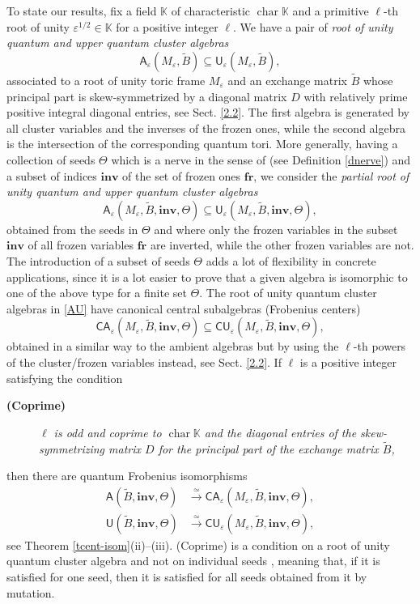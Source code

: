 \documentclass[11pt]{amsart}
\theoremstyle{plain}
\newcommand \thref[1]{Theorem \ref{t#1}}
\newcommand \deref[1]{Definition \ref{d#1}}
\def \KK {{\mathbb C}}
\def \KK {{\mathbb K}}
\def \A {{\boldsymbol{\mathsf A}}}
\def \C {{\boldsymbol{\mathsf C}}}
\def \U {{\boldsymbol{\mathsf U}}}
\def \B  {{\widetilde{B}}}
\newcommand \fr {{\mathbf{fr}}}
\newcommand \inv {{\mathbf{inv}}}
\def \ep {\varepsilon}
\DeclareMathOperator \charr { {\mathrm{char}} }
\begin{document}
To state our results, fix a field $\KK$ of characteristic $\charr \KK$ and a primitive $\ell$-th root of unity $\ep^{1/2} \in \KK$ for a positive integer $\ell$. We have a pair of {\em{root of unity quantum and upper quantum cluster algebras}} 
\[
\A_\ep(M_\ep, \B) \subseteq \U_\ep(M_\ep, \B),
\]
associated to a root of unity toric frame $M_\ep$ and an exchange matrix $\B$ whose principal part is skew-symmetrized by a diagonal matrix $D$ with relatively prime positive integral diagonal entries, see Sect. \ref{2.2}.
The first algebra is generated by all cluster variables and the inverses of the frozen ones, while the second algebra is the intersection of the corresponding quantum tori. More generally, having a collection of seeds $\Theta$ which is a nerve in the sense of \cite{F} (see \deref{nerve}) and a subset of indices $\inv$ of the set of frozen ones $\fr$, we consider the {\em{partial root of unity quantum and upper quantum cluster algebras}} 
\begin{equation}
    \label{AU}
\A_\ep(M_\ep, \B, \inv,\Theta) \subseteq \U_\ep(M_\ep, \B, \inv,\Theta),
\end{equation}
obtained from the seeds in $\Theta$ and where only the frozen variables in the subset $\inv$ of all frozen variables $\fr$ are inverted, while the other frozen variables are not. The introduction of a subset of seeds $\Theta$ adds a lot of flexibility in concrete applications, since it is a lot easier to prove that a given algebra is isomorphic to one of the above type for a finite set $\Theta$. The root of unity quantum cluster algebras in \eqref{AU} have canonical central subalgebras (Frobenius centers)
\[
\C\A_\ep(M_\ep, \B, \inv,\Theta) \subseteq \C\U_\ep(M_\ep, \B, \inv,\Theta),
\]
obtained in a similar way to the ambient algebras but by using the $\ell$-th powers of the cluster/frozen variables instead, see Sect. \ref{2.2}. If $\ell$ is a positive integer satisfying the condition
\smallskip

\begin{description}
\item[{\bf{(Coprime)}}] {\em{$\ell$ is odd and coprime to $\charr \KK$ and the diagonal entries of the skew-symmetrizing matrix $D$ for the principal part of the exchange matrix $\B$,}}
\end{description}
\smallskip
\noindent
then there are quantum Frobenius isomorphisms \cite{HLY,NTY2} 
\begin{align*}
\A(\B, \inv, \Theta) &\stackrel{\simeq}{\longrightarrow} \C\A_\ep(M_\ep, \B, \inv, \Theta), 
\\
\U(\B, \inv, \Theta) &\stackrel{\simeq}{\longrightarrow} \C\U_\ep(M_\ep, \B, \inv, \Theta),
\end{align*}
see \thref{cent-isom}(ii)--(iii).
(Coprime) is a condition on a root of unity quantum
cluster algebra and not on individual seeds \cite[Remark 4.3]{NTY2}, meaning that, if it is satisfied for one seed, then it is satisfied for all seeds obtained from it by mutation. 
\end{document}
